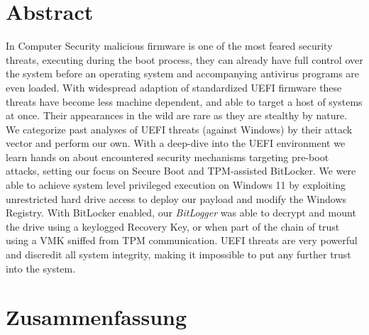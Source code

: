 

\chapter*{Abstract}
\label{sec:abstract}
\thispagestyle{empty}

In Computer Security malicious firmware is one of the most feared security threats, executing during the boot process, they can already have full control over the system before an operating system and accompanying antivirus programs are even loaded.
With widespread adaption of standardized \acs{UEFI} firmware these threats have become less machine dependent, and able to target a host of systems at once.
Their appearances in the wild are rare as they are stealthy by nature. We categorize past analyses of \acs{UEFI} threats (against Windows) by their attack vector and perform our own.
With a deep-dive into the \acs{UEFI} environment we learn hands on about encountered security mechanisms targeting pre-boot attacks, setting our focus on Secure Boot and \acs{TPM}-assisted BitLocker.
We were able to achieve system level privileged execution on Windows 11 by exploiting unrestricted hard drive access to deploy our payload and modify the Windows Registry. With BitLocker enabled, our \emph{BitLogger} was able to decrypt and mount the drive using a keylogged Recovery Key, or when part of the chain of trust using a \acs{VMK} sniffed from \acs{TPM} communication.
\acs{UEFI} threats are very powerful and discredit all system integrity, making it impossible to put any further trust into the system.

\acresetall

\chapter*{Zusammenfassung}
\thispagestyle{empty}
\label{sec:zusammenfassung}

\blindtext

\acresetall